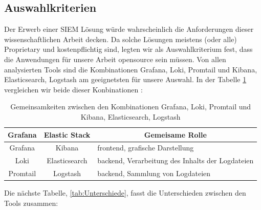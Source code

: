 \newpage
\subsection{Auswahlkriterien}
Der Erwerb einer \gls{SIEM} Lösung würde wahrscheinlich die Anforderungen dieser wissenschaftlichen Arbeit decken. Da solche Lösungen meistens (oder alle) \gls{Proprietary} und kostenpflichtig sind, legten wir als Auswahlkriterium fest, dass die Anwendungen für unsere Arbeit \gls{opensource} sein müssen. Von allen analysierten Tools sind die Kombinationen Grafana, Loki, Promtail und Kibana, Elasticsearch, Logstash  am geeignetsten für unsere Auswahl. In der Tabelle \ref{tab:Vergleich_GrafanaELK} vergleichen wir beide dieser Konbinationen \citep{Anand_LokixELK}:

\begin{table}[H]
   \begin{tabularx}{\textwidth}{|c|c|X|}
   \hline
   \multicolumn{1}{|c|}{\textbf{Grafana}} & \multicolumn{1}{|c|}{\textbf{Elastic Stack}} & \multicolumn{1}{|c|}{\textbf{Gemeisame Rolle}} \\
   \hline
      Grafana & Kibana & \gls{frontend}, grafische Darstellung\\
   \hline
      Loki & Elasticsearch & \gls{backend}, Verarbeitung des Inhalts der Logdateien \\
   \hline
      Promtail & Logstash & \gls{backend}, Sammlung von Logdateien \\
      \hline
   \end{tabularx}
   \caption[Gemeinsamkeiten zwischen den Kombinationen Grafana, Loki, Promtail und Kibana, Elasticsearch, Logstash]
   {Gemeinsamkeiten zwischen den Kombinationen Grafana, Loki, Promtail und Kibana, Elasticsearch, Logstash}
   \label{tab:Vergleich_GrafanaELK}
\end{table}

Die nächste Tabelle, \ref{tab:Unterschiede}, fasst die Unterschieden zwischen den Tools zusammen:

